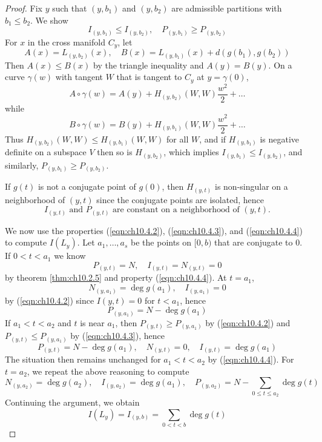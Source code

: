 \documentclass[../main]{subfiles}
\begin{document}
\begin{proof}
Fix $y$ such that $(y,b_1)$ and $(y,b_2)$ are admissible partitions with $b_1\le b_2$. We show
\begin{equation} \tag{12}\label{eqn:ch10.4.3}
I_{(y,b_1)} \le I_{(y,b_2)},
\quad P_{(y,b_1)} \ge P_{(y,b_2)}
\end{equation}
For $x$ in the cross manifold $C_y$, let
\[A(x) = L_{(y,b_2)}(x),
\quad B(x) = L_{(y,b_1)}(x) + d(g(b_1),g(b_2))\]
Then $A(x)\le B(x)$ by the triangle inequality and $A(y)=B(y)$. On a curve $\gamma(w)$ with tangent $W$ that is tangent to $C_y$ at $y=\gamma(0)$,
\[A\circ\gamma(w) = A(y) + H_{(y,b_2)}(W,W)\frac{w^2}{2} + \ldots\]
while
\[B\circ\gamma(w) = B(y) + H_{(y,b_1)}(W,W)\frac{w^2}{2} + \ldots\]
Thus $H_{(y,b_2)}(W,W)\le H_{(y,b_1)}(W,W)$ for all $W$, and if $H_{(y,b_1)}$ is negative definite on a subspace $V$ then so is $H_{(y,b_2)}$, which implies $I_{(y,b_1)}\le I_{(y,b_2)}$, and similarly, $P_{(y,b_1)}\ge P_{(y,b_2)}$.

If $g(t)$ is not a conjugate point of $g(0)$, then $H_{(y,t)}$ is non-singular on a neighborhood of $(y,t)$ since the conjugate points are isolated, hence
\begin{equation}\tag{13} \label{eqn:ch10.4.4}
I_{(y,t)} \text{ and } P_{(y,t)}
\text{ are constant on a neighborhood of } (y,t).
\end{equation}

We now use the properties (\ref{eqn:ch10.4.2}), (\ref{eqn:ch10.4.3}), and (\ref{eqn:ch10.4.4}) to compute $I(L_y)$. Let $a_1,\ldots,a_s$ be the points on $[0,b)$ that are conjugate to 0. If $0<t<a_1$ we know
\[P_{(y,t)} = N,
\quad I_{(y,t)} = N_{(y,t)} = 0\]
by theorem \ref{thm:ch10.2.5} and property (\ref{eqn:ch10.4.4}). At $t=a_1$,
\[N_{(y,a_1)} = \deg g(a_1),
\quad I_{(y,a_1)} = 0\]
by (\ref{eqn:ch10.4.2}) since $I{(y,t)}=0$ for $t<a_1$, hence
\[P_{(y,a_1)} = N - \deg g(a_1)\]
If $a_1<t<a_2$ and $t$ is near $a_1$, then $P_{(y,t)}\ge P_{(y,a_1)}$ by (\ref{eqn:ch10.4.2}) and $P_{(y,t)}\le P_{(y,a_1)}$ by (\ref{eqn:ch10.4.3}), hence
\[P_{(y,t)} = N - \deg g(a_1),
\quad N_{(y,t)} = 0,
\quad I_{(y,t)} = \deg g(a_1)\]
The situation then remains unchanged for $a_1<t<a_2$ by (\ref{eqn:ch10.4.4}). For $t=a_2$, we repeat the above reasoning to compute
\[N_{(y,a_2)} = \deg g(a_2),
\quad I_{(y,a_2)} = \deg g(a_1),
\quad P_{(y,a_2)} = N - \sum_{0\le t\le a_2}\deg g(t)\]
Continuing the argument, we obtain
\[I(L_y) = I_{(y,b)} = \sum_{0<t<b}\deg g(t)\]
\end{proof}
\end{document}
